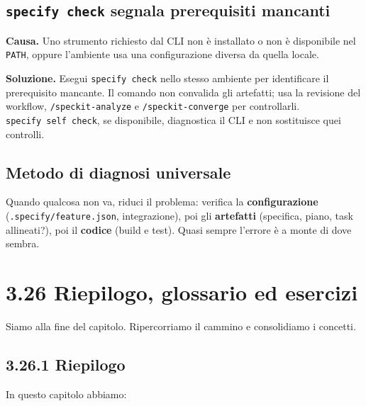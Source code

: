 \documentclass[
  italian,
  10pt,
]{book}
\begin{document}
\subsection{\texorpdfstring{\texttt{specify\ check} segnala prerequisiti
mancanti}{specify check segnala prerequisiti mancanti}}\label{specify-check-segnala-prerequisiti-mancanti}

\textbf{Causa.} Uno strumento richiesto dal CLI non è installato o non è
disponibile nel \texttt{PATH}, oppure l'ambiente usa una configurazione
diversa da quella locale.

\textbf{Soluzione.} Esegui \texttt{specify\ check} nello stesso ambiente
per identificare il prerequisito mancante. Il comando non convalida gli
artefatti; usa la revisione del workflow, \texttt{/speckit-analyze} e
\texttt{/speckit-converge} per controllarli.
\texttt{specify\ self\ check}, se disponibile, diagnostica il CLI e non
sostituisce quei controlli.

\subsection{Metodo di diagnosi
universale}\label{metodo-di-diagnosi-universale-1}

Quando qualcosa non va, riduci il problema: verifica la
\textbf{configurazione} (\texttt{.specify/feature.json}, integrazione),
poi gli \textbf{artefatti} (specifica, piano, task allineati?), poi il
\textbf{codice} (build e test). Quasi sempre l'errore è a monte di dove
sembra.

\section{3.26 Riepilogo, glossario ed
esercizi}\label{riepilogo-glossario-ed-esercizi-2}

Siamo alla fine del capitolo. Ripercorriamo il cammino e consolidiamo i
concetti.

\subsection{3.26.1 Riepilogo}\label{riepilogo-2}

In questo capitolo abbiamo:
\end{document}
